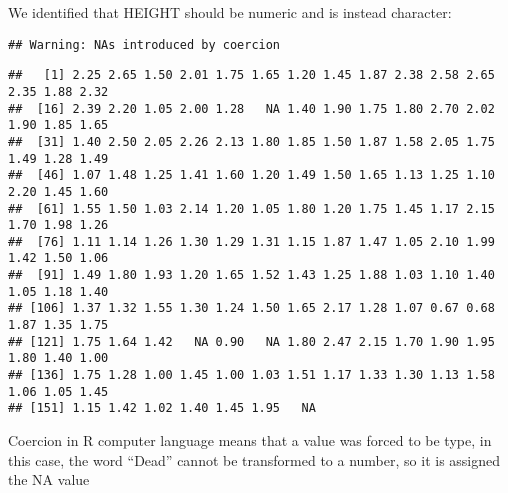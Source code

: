 \documentclass[
]{article}
\newenvironment{Shaded}{\begin{snugshade}}{\end{snugshade}}
\newcommand{\AttributeTok}[1]{\textcolor[rgb]{0.77,0.63,0.00}{#1}}
\newcommand{\FunctionTok}[1]{\textcolor[rgb]{0.00,0.00,0.00}{#1}}
\newcommand{\NormalTok}[1]{#1}
\newcommand{\OtherTok}[1]{\textcolor[rgb]{0.56,0.35,0.01}{#1}}
\newcommand{\SpecialCharTok}[1]{\textcolor[rgb]{0.00,0.00,0.00}{#1}}
\newcommand{\StringTok}[1]{\textcolor[rgb]{0.31,0.60,0.02}{#1}}
\begin{document}
We identified that HEIGHT should be numeric and is instead character:

\begin{Shaded}
\end{Shaded}

\begin{verbatim}
## Warning: NAs introduced by coercion
\end{verbatim}

\begin{Shaded}
\end{Shaded}

\begin{verbatim}
##   [1] 2.25 2.65 1.50 2.01 1.75 1.65 1.20 1.45 1.87 2.38 2.58 2.65 2.35 1.88 2.32
##  [16] 2.39 2.20 1.05 2.00 1.28   NA 1.40 1.90 1.75 1.80 2.70 2.02 1.90 1.85 1.65
##  [31] 1.40 2.50 2.05 2.26 2.13 1.80 1.85 1.50 1.87 1.58 2.05 1.75 1.49 1.28 1.49
##  [46] 1.07 1.48 1.25 1.41 1.60 1.20 1.49 1.50 1.65 1.13 1.25 1.10 2.20 1.45 1.60
##  [61] 1.55 1.50 1.03 2.14 1.20 1.05 1.80 1.20 1.75 1.45 1.17 2.15 1.70 1.98 1.26
##  [76] 1.11 1.14 1.26 1.30 1.29 1.31 1.15 1.87 1.47 1.05 2.10 1.99 1.42 1.50 1.06
##  [91] 1.49 1.80 1.93 1.20 1.65 1.52 1.43 1.25 1.88 1.03 1.10 1.40 1.05 1.18 1.40
## [106] 1.37 1.32 1.55 1.30 1.24 1.50 1.65 2.17 1.28 1.07 0.67 0.68 1.87 1.35 1.75
## [121] 1.75 1.64 1.42   NA 0.90   NA 1.80 2.47 2.15 1.70 1.90 1.95 1.80 1.40 1.00
## [136] 1.75 1.28 1.00 1.45 1.00 1.03 1.51 1.17 1.33 1.30 1.13 1.58 1.06 1.05 1.45
## [151] 1.15 1.42 1.02 1.40 1.45 1.95   NA
\end{verbatim}

Coercion in R computer language means that a value was forced to be
type, in this case, the word ``Dead'' cannot be transformed to a number,
so it is assigned the NA value

\begin{Shaded}
\end{Shaded}
\end{document}
